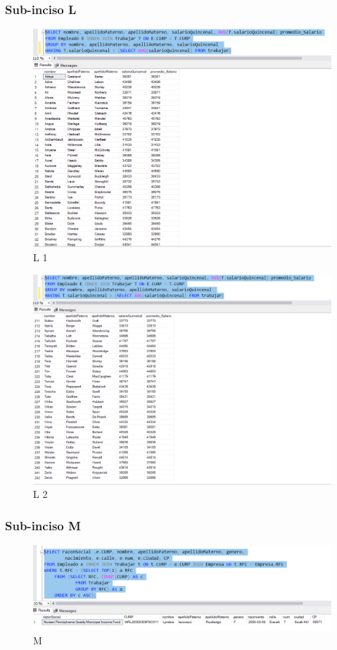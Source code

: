 \documentclass[a4paper, 12pt]{report}
\begin{document}
\subsubsection*{Sub-inciso L}
    \begin{figure}
        \includegraphics[width=\textwidth]
            {img/L1.png}\hfill
    \caption{L 1}
    \end{figure}
    \begin{figure}
        \includegraphics[width=\textwidth]
            {img/L2.png}\hfill
    \caption{L 2}
    \end{figure}

\subsubsection*{Sub-inciso M}
    \begin{figure}
        \includegraphics[width=\textwidth]
            {img/M.png}\hfill
    \caption{M}
    \end{figure}
\end{document}
